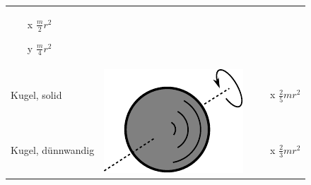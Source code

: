 \begin{table}[h!]
\begin{tabular}{m{2cm} c m{}}
\begin{itemize}
		\item[x] $\frac{m}{2} r^2$
		\item[y] $\frac{m}{4} r^2$
		\end{itemize} \\
Kugel, solid & \multirow{2}{*}{
	\begin{minipage}{0.3\textwidth}
	\centering
	\includegraphics[scale=\traegscale]{traeg-kugel.pdf}
	\end{minipage}}
		&
		\begin{itemize}
			\item[x] $\frac{2}{5} mr^2$
		\end{itemize} \\
Kugel, dünnwandig & &
		\begin{itemize}
			\item[x] $\frac{2}{3} mr^2$
		\end{itemize}
\end{tabular}
\end{table}

